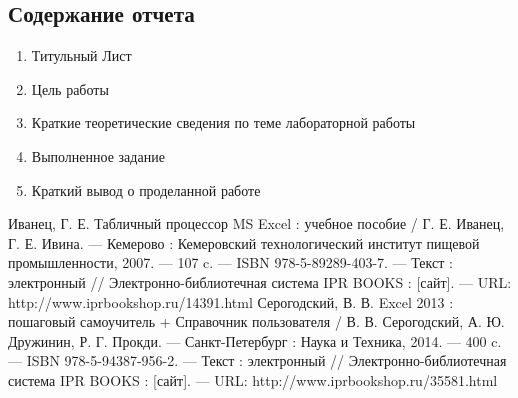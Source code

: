 \subsection{Содержание отчета}
\begin{enumerate}
  \item Титульный Лист
  \item Цель работы
  \item Краткие теоретические сведения по теме лабораторной работы
  \item Выполненное задание
  \item Краткий вывод о проделанной работе
\end{enumerate}

\begin{thebibliography}{3}
    Иванец, Г. Е. Табличный процессор MS Excel : учебное пособие / Г. Е. Иванец, Г. Е. Ивина. — Кемерово : Кемеровский технологический институт пищевой промышленности, 2007. — 107 c. — ISBN 978-5-89289-403-7. — Текст : электронный // Электронно-библиотечная система IPR BOOKS : [сайт]. — URL: http://www.iprbookshop.ru/14391.html
  Серогодский, В. В. Excel 2013 : пошаговый самоучитель + Справочник пользователя / В. В. Серогодский, А. Ю. Дружинин, Р. Г. Прокди. — Санкт-Петербург : Наука и Техника, 2014. — 400 c. — ISBN 978-5-94387-956-2. — Текст : электронный // Электронно-библиотечная система IPR BOOKS : [сайт]. — URL: http://www.iprbookshop.ru/35581.html
\end{thebibliography}


%
